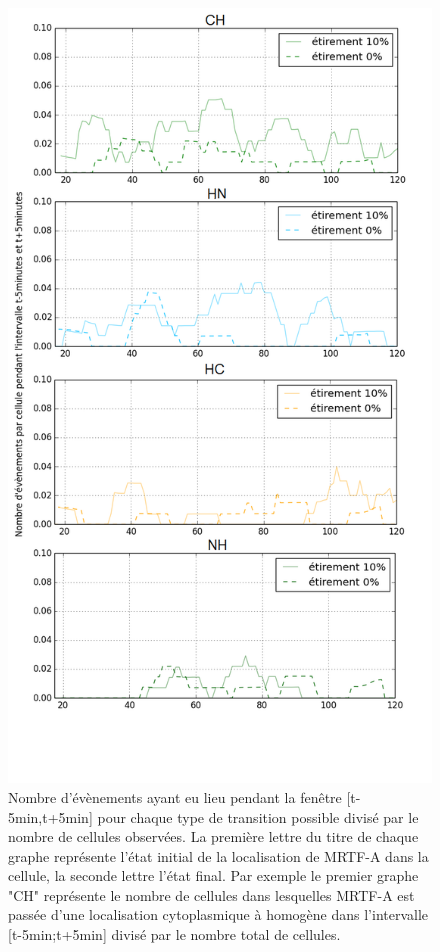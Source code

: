 \begin{figure}
\includegraphics[scale=0.33]{Figures/Etirement10_vs_0_translocations.png} 
\caption{\label{transloc_dyn_Et10} Nombre d'évènements ayant eu lieu pendant la fenêtre [t-5min,t+5min] pour chaque type de transition possible divisé par le nombre de cellules observées. La première lettre du titre de chaque graphe représente l'état initial de la localisation de MRTF-A dans la cellule, la seconde lettre l'état final. Par exemple le premier graphe "CH" représente le nombre de cellules dans lesquelles MRTF-A est passée d'une localisation cytoplasmique à homogène dans l'intervalle [t-5min;t+5min] divisé par le nombre total de cellules.}
\end{figure}

